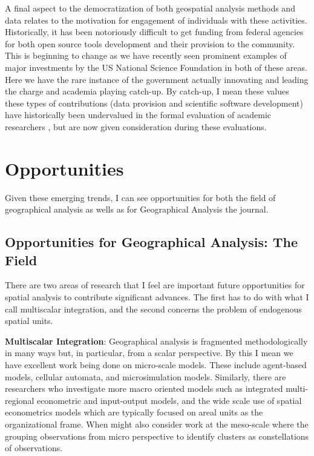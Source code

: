 \documentclass[11pt]{article}
\begin{document}
A final aspect to the democratization of both geospatial analysis methods and
data relates to the motivation for engagement of individuals with these activities.
Historically, it has been notoriously difficult to get funding from federal
agencies for both open source tools development and their provision to the
community. This is beginning to change as we have recently seen prominent
examples of major investments by the US National Science Foundation in both of
these areas. Here we have the rare instance of the government actually
innovating and leading the charge and academia playing catch-up. By catch-up, I
mean these values these types of contributions (data provision and scientific
software development) have historically been undervalued in the formal
evaluation of academic researchers \cite{eghbal2016roads}, but are now given
consideration during these evaluations.

\section{Opportunities}
\label{sec:org000df0f}
Given these emerging trends, I can see opportunities for both the field of
geographical analysis as wells as for Geographical Analysis the journal.
\subsection{Opportunities for Geographical Analysis: The Field}
\label{sec:org52b49a6}
There are two areas of research that I feel are important future
opportunities for spatial analysis to contribute significant advances. The
first has to do with what I call multiscalar integration, and the second
concerns the problem of endogenous spatial units.

\textbf{Multiscalar Integration}: Geographical analysis is fragmented methodologically
in many ways but, in particular, from a scalar perspective. By this I mean we
have excellent work being done on micro-scale models. These include agent-based
models, cellular automata, and microsimulation models. Similarly, there are
researchers who investigate more macro oriented models such as integrated
multi-regional econometric and input-output models, and the wide scale use of
spatial econometrics models which are typically focused on areal units as the
organizational frame. When might also consider work at the meso-scale where
the grouping observations from micro perspective to identify clusters
as constellations of observations.
\end{document}
